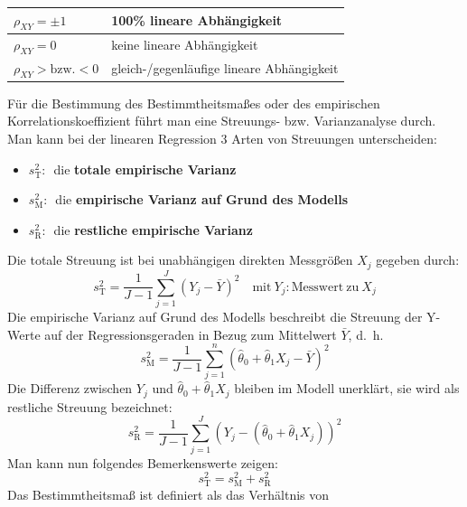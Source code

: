 \begin{center}
	\begin{tabular}
		{|p{100pt}|p{209pt}|} \hline 
		$\rho_{XY} = \pm 1$&
		100{\%} lineare Abh\"{a}ngigkeit  \\
		\hline $\rho_{XY} = 0$&
		keine lineare Abh\"{a}ngigkeit \\
		\hline $\rho_{XY} > \mbox{bzw.} < 0$&
		gleich-/gegenl\"{a}ufige lineare Abh\"{a}ngigkeit \\
		\hline
	\end{tabular}
\end{center}

F\"{u}r die Bestimmung des Bestimmtheitsma{\ss}es oder des
empirischen Korrelationskoeffizient f\"{u}hrt man eine Streuungs-
bzw. Varianzanalyse durch. Man kann bei der linearen Regression 3
Arten von Streuungen unterscheiden:
\begin{itemize}
	\item[] $s_{\mathrm{T}}^2:$~die \textbf{totale empirische Varianz}
	\item[] $s_{\mathrm{M}}^2:$~die \textbf{empirische Varianz auf Grund des Modells}
	\item[] $s_{\mathrm{R}}^2:$~die \textbf{restliche empirische Varianz}
\end{itemize}
Die totale Streuung ist bei unabhängigen direkten Messgrößen $X_j$ gegeben
durch:
\begin{equation}
s_{\mathrm{T}}^2 = \frac{1}{J - 1}\sum\limits_{j = 1}^J {(Y_j - \bar {Y})^2}
\quad \mathrm{mit~} Y_j : \mathrm{Messwert ~zu~}  X_j 
\end{equation}
Die empirische Varianz auf Grund des Modells beschreibt die
Streuung der Y-Werte auf der Regressionsgeraden in Bezug zum
Mittelwert $\bar{Y}$, d.~h.
\begin{equation}
s_{\mathrm{M}}^2 = \frac{1}{J - 1}\sum\limits_{j = 1}^n {(\hat{\theta}_0 + \hat{\theta}_1 X_j - \bar
	{Y})^2}
\end{equation}
Die Differenz zwischen $Y_j$ und $\hat{\theta}_0 + \hat{\theta}_1 X_j $ bleiben im
Modell unerkl\"{a}rt, sie wird als restliche Streuung bezeichnet:
\begin{equation}
s_{\mathrm{R}}^2 = \frac{1}{J - 1}\sum\limits_{j = 1}^J {(Y_j - (\hat{\theta}_0 
	+ \hat{\theta}_1 X_j))^2}
\end{equation}
Man kann nun folgendes Bemerkenswerte zeigen:
\begin{equation}
s_{\mathrm{T}}^2 = s_{\mathrm{M}}^2 + s_{\mathrm{R}}^2
\end{equation}
Das Bestimmtheitsma{\ss} ist definiert als das Verh\"{a}ltnis von
